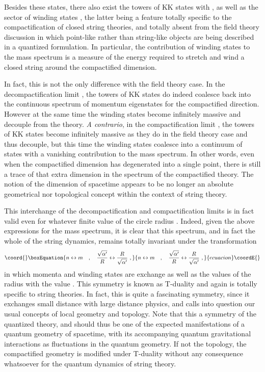 \documentclass[a4paper,11pt]{article}
\begin{document}
Besides these states, there also exist the towers of KK states with \coordHE{},
as well as the sector of winding states \coordHE{}, the latter being a feature
totally specific to the compactification of closed string theories, and
totally absent from the field theory discussion in which point-like rather
than string-like objects are being described in a quantized formulation.
In particular, the contribution of winding states to the mass spectrum
is a measure of the energy required to stretch and wind a closed string
around the compactified dimension.

In fact, this is not the only difference with the field theory case.
In the decompactification limit \coordHE{}, the towers
of KK states do indeed coalesce back into the continuous spectrum of
momentum eigenstates for the com\-pac\-ti\-fied direction. However at the same
time the winding states \coordHE{} become infinitely massive and decouple
from the theory. {\sl A contrario\/}, in the com\-pac\-ti\-fi\-ca\-tion limit
\coordHE{}, the towers of KK states become infinitely massive as
they do in the field theory case and thus decouple, but this time the
winding states \coordHE{} coalesce into a continuum of states with a vanishing
contribution to the mass spectrum. In other words, even when the compactified
dimension has degenerated into a single point, there is still a trace of
that extra dimension in the spectrum of the compactified theory. The notion
of the dimension of spacetime appears to be no longer an absolute geometrical 
nor topological concept within the context of string theory.

This interchange of the decompactification and compactification limits
is in fact valid even for whatever finite value of the circle radius \coordHE{}.
Indeed, given the above expressions for the mass spectrum, it is clear that
this spectrum, and in fact the whole of the string dynamics, remains totally
invariant under the transformation
\begin{equation}\coord{}\boxEquation{
n\leftrightarrow m\ \ \ ,\ \ \ 
\frac{\sqrt{\alpha'}}{R}\leftrightarrow\frac{R}{\sqrt{\alpha'}}\ ,
}{
n\leftrightarrow m\ \ \ ,\ \ \ 
\frac{\sqrt{\alpha'}}{R}\leftrightarrow\frac{R}{\sqrt{\alpha'}}\ ,
}{ecuacion}\coordE{}\end{equation}
in which momenta and winding states are exchange as well as the values
of the radius with the value \coordHE{}. This symmetry is known as
T-duality and again is totally specific to string theories.\cite{Tdual} 
In fact, this is quite a fascinating symmetry, since it exchanges small 
distance with large distance physics, and calls into question our usual 
concepts of local geometry and topology. Note that this a symmetry of the 
quantized theory, and should thus be one of the expected manifestations of a
quantum geometry of spacetime, with its accompanying quantum gravitational
interactions as fluctuations in the quantum geometry. If not the topology,
the compactified geometry is modified under T-duality without any consequence
whatsoever for the quantum dynamics of string theory.
\end{document}
